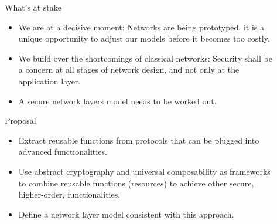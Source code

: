 \documentclass[final]{beamer}
\newlength{\sepwid}
\newlength{\onecolwid}
\newlength{\twocolwid}
\begin{document}
\begin{frame}[t]
\begin{columns}[t]
\begin{column}{\onecolwid}
\begin{block}{What’s at stake}

\begin{itemize}
\item We are at a decisive moment: Networks are being prototyped, it is a unique opportunity to adjust our models before it becomes too costly.
\item We build over the shortcomings of classical networks: Security shall be a concern at all stages of network design, and not only at the application layer.
\item A secure network layers model needs to be worked out.
\end{itemize}

\end{block}

\begin{block}{Proposal}

\begin{itemize}
\item Extract reusable functions from protocols that can be plugged into advanced functionalities.
\item Use abstract cryptography \cite{Maurer11abstractcryptography} and universal composability as frameworks to combine reusable functions (resources) to achieve other secure, higher-order, functionalities.
\item Define a network layer model consistent with this approach.

\end{itemize}
\end{block}

\end{column} %

\begin{column}{\sepwid}\end{column} %

\begin{column}{\twocolwid} %

\begin{columns}[t,totalwidth=\twocolwid] %

\begin{column}{\twocolwid}\vspace{-.6in} %


\end{column}
\end{columns}
\end{column}
\end{columns}
\end{frame}
\end{document}
